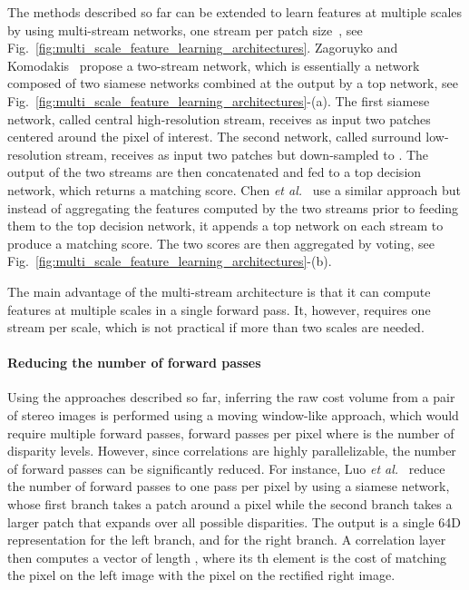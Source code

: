 \documentclass[10pt,journal,compsoc]{IEEEtran}
\newcommand{\etal}{\emph{et al.}}
\begin{document}
The methods described so far can be extended to learn features at multiple scales by using multi-stream networks, one stream per patch size~\cite{zagoruyko2015learning,chen2015deep}, see Fig.~\ref{fig:multi_scale_feature_learning_architectures}. Zagoruyko and Komodakis~\cite{zagoruyko2015learning} propose a two-stream network, which is essentially a network composed of two siamese networks combined at the output by a top network, see Fig.~\ref{fig:multi_scale_feature_learning_architectures}-(a). The first siamese network, called central high-resolution stream, receives as input two  patches centered around the pixel of interest.  The second network, called surround low-resolution stream,  receives as input two  patches but down-sampled to .  The output of the two streams are then concatenated and fed to a top decision network, which returns a matching score.  Chen \etal~\cite{chen2015deep}  use a similar approach but instead of aggregating the features computed by the two streams prior to feeding them to the top  decision network,  it appends a top network on each stream to produce a matching score. The two scores are then aggregated by voting, see Fig.~\ref{fig:multi_scale_feature_learning_architectures}-(b). 

The main advantage of the multi-stream architecture is that it can compute  features at multiple scales in a single forward pass. It, however,  requires one stream per scale, which  is not practical if more than two scales are needed. 

\paragraph{Reducing the number of forward passes}

Using the approaches described so far, inferring the raw cost volume  from a pair of stereo images is performed using a moving window-like approach, which would require multiple forward passes,  forward passes per pixel where   is the number of disparity levels.   However, since correlations are highly parallelizable,  the number of forward passes can be significantly reduced. For instance,  Luo \etal~\cite{luo2016efficient} reduce the number of forward passes to one pass per pixel by using a siamese network, whose first branch takes a patch around a pixel while the second branch takes a larger patch that expands over all possible disparities.    The output is  a single 64D representation for the left branch, and  for the right branch.  A correlation layer then computes a vector of length , where its th element is the cost of matching the pixel  on the left image with the pixel  on the rectified right image. 
\end{document}
